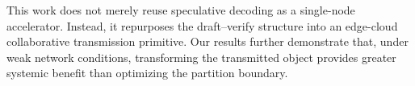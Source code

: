 \documentclass[a4paper,fleqn]{cas-dc}
\begin{document}
This work does not merely reuse speculative decoding as a single-node accelerator. Instead, it repurposes the draft–verify structure into an edge-cloud collaborative transmission primitive. Our results further demonstrate that, under weak network conditions, transforming the transmitted object provides greater systemic benefit than optimizing the partition boundary.




\end{document}
